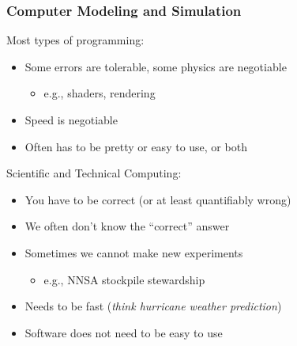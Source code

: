\documentclass[mathserif]{beamer}
\begin{document}
\begin{frame}
  \frametitle{Computer Modeling and Simulation}

  \begin{block}{Most types of programming:}
    \begin{itemize}
    \item Some errors are tolerable, some physics are negotiable
    \begin{itemize}
     \item e.g., shaders, rendering
    \end{itemize}
    \item Speed is negotiable
    \item Often has to be pretty or easy to use, or both
    \end{itemize}
  \end{block}

  \begin{block}{Scientific and Technical Computing:}
    \begin{itemize}
    \item You have to be correct (or at least quantifiably wrong)
    \item We often don't know the ``correct'' answer      
    \item Sometimes we cannot make new experiments 
	  \begin{itemize}
	   \item  e.g., NNSA stockpile stewardship
	  \end{itemize}
    \item Needs to be fast ({\em think hurricane weather prediction})
    \item Software does not need to be easy to use
    \end{itemize}
  \end{block}

\end{frame}
\end{document}
